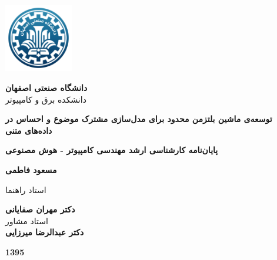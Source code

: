 \thispagestyle{empty}
\begin{center}
\includegraphics[height=3cm]{firstpage-img/IUTLogoFA}

{\large
	\textbf{دانشگاه صنعتی اصفهان}\\
	دانشکده  برق و کامپیوتر
}
\vspace{3.5cm}

{\LARGE
	\textbf{توسعه‌ی ماشین بلتزمن محدود برای مدل‌سازی مشترک موضوع و احساس در داده‌های متنی}\\
}
\vspace{3.5cm}

{\large
	\textbf{پایان‌نامه کارشناسی ارشد مهندسی کامپیوتر - هوش مصنوعی}\\
}
\vspace{1cm}

{\Large
	\textbf{مسعود فاطمی}\\
}
\vspace{2.5cm}

{\large
	استاد راهنما\\
}
\vspace{0.5cm}

{\Large
	\textbf{دکتر مهران صفایانی}\\
}
\vspace{1cm}
{\large
	استاد مشاور\\
}
\vspace{0.5cm}
{\Large
	\textbf{دکتر عبدالرضا میرزایی}\\
}
\vspace{2cm}

{\Large
	\textbf{1395}
}

\end{center}
\restoregeometry
\pagebreak

